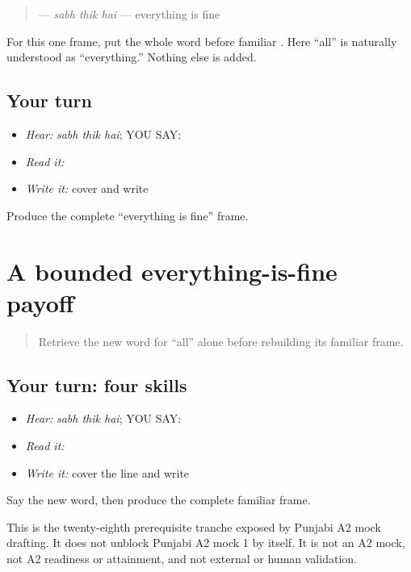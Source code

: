 \begin{grammarlens}[title={Grammar Lens}]
\begin{quote}
\textbf{  } — \emph{sabh thik hai} — everything is fine
\end{quote}

For this one frame, put the whole word \textbf{} before familiar \textbf{ }. Here “all” is naturally understood as “everything.” Nothing else is added.
\end{grammarlens}

\subsection*{Your turn}
\begin{itemize}
\raggedright
  \item \emph{Hear:} \emph{sabh thik hai}; YOU SAY: \textbf{  }
  \item \emph{Read it:} \textbf{  }
  \item \emph{Write it:} cover and write \textbf{  }
\end{itemize}

\begin{tcolorbox}[breakable,colback=teal!4,colframe=teal!35!black,title={Before you move on}]
Produce the complete “everything is fine” frame.
\end{tcolorbox}
\section[\texorpdfstring{\pa{ਸਭ} \pa{ਠੀਕ} \pa{ਹੈ} (sabh thik hai)}{ਸਭ ਠੀਕ ਹੈ (sabh thik hai)}]{A bounded everything-is-fine payoff}

\label{lesson:PA-C205-payoff}



\begin{quote}
Retrieve the new word for “all” alone before rebuilding its familiar frame.
\end{quote}

\subsection*{Your turn: four skills}
\begin{itemize}
\raggedright
  \item \emph{Hear:} \emph{sabh thik hai}; YOU SAY: \textbf{  }
  \item \emph{Read it:} \textbf{  }
  \item \emph{Write it:} cover the line and write \textbf{  }
\end{itemize}

\begin{tcolorbox}[breakable,colback=teal!4,colframe=teal!35!black,title={Before you move on}]
Say the new word, then produce the complete familiar frame.

This is the twenty-eighth prerequisite tranche exposed by Punjabi A2 mock drafting. It does not unblock Punjabi A2 mock 1 by itself. It is not an A2 mock, not A2 readiness or attainment, and not external or human validation.
\end{tcolorbox}
